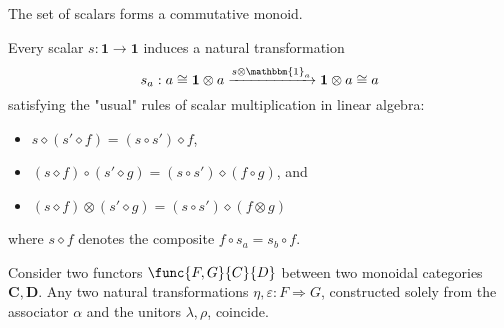 
    \begin{property}
        The set of scalars forms a commutative monoid.
    \end{property}
    \begin{property}
        Every scalar $s:\mathbf{1}\rightarrow\mathbf{1}$ induces a natural transformation \[s_a:a\cong\mathbf{1}\otimes a\xrightarrow{s\otimes\mathbbm{1}_a}\mathbf{1}\otimes a\cong a\] satisfying the "usual" rules of scalar multiplication in linear algebra:
        \begin{itemize}
            \item $s\diamond(s'\diamond f) = (s\circ s')\diamond f$,
            \item $(s\diamond f)\circ(s'\diamond g) = (s\circ s')\diamond(f\circ g)$, and
            \item $(s\diamond f)\otimes(s'\diamond g) = (s\circ s')\diamond(f\otimes g)$
        \end{itemize}
        where $s\diamond f$ denotes the composite $f\circ s_a = s_b\circ f$.
    \end{property}


    \begin{theorem}
        Consider two functors $\func{F, G}{C}{D}$ between two monoidal categories $\mathbf{C}, \mathbf{D}$. Any two natural transformations $\eta,\varepsilon:F\Rightarrow G$, constructed solely from the associator $\alpha$ and the unitors $\lambda, \rho$, coincide.
    \end{theorem}


